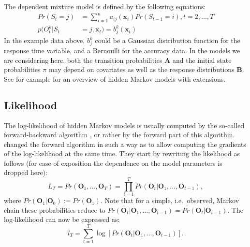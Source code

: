 \documentclass[article]{jss}
\newcommand{\vc}{\mathbf}
\newcommand{\mat}{\mathbf}
\begin{document}
The dependent mixture model is defined by the following equations: 
\begin{align}
	Pr(S_{t} = j) &= \sum_{i=1}^n a_{ij}(\vc{x}_t) Pr(S_{t-1} = i), t=2, \ldots, T \\
	p(O_{t}^k|S_t &= j, \vc{x}_t) = b_j^k(\vc{x}_t)
\end{align}
In the example data above, $b_j^k$ could be a Gaussian distribution
function for the response time variable, and a Bernoulli for the
accuracy data.  In the models we are considering here, both the
transition probabilities $\mat{A}$ and the initial state probabilities $\pi$
may depend on covariates as well as the response distributions $\vc{B}$. 
See for example \citet{Fruhwirth2006} for an overview of 
hidden Markov models with extensions. 

\subsection{Likelihood}

The log-likelihood of hidden Markov models is usually computed by the
so-called forward-backward algorithm \citep{Baum1966,Rabiner1989}, or
rather by the forward part of this algorithm.  \cite{Lystig2002}
changed the forward algorithm in such a way as to allow computing the
gradients of the log-likelihood at the same time.  They start by
rewriting the likelihood as follows (for ease of exposition the
dependence on the model parameters is dropped here):
\begin{equation}
	L_{T} = Pr(\vc{O}_{1}, \ldots, \vc{O}_{T}) = \prod_{t=1}^{T} 
Pr(\vc{O}_{t}|\vc{O}_{1}, 
	\ldots, \vc{O}_{t-1}), 
	\label{condLike}
\end{equation}
where $Pr(\vc{O}_{1}|\vc{O}_{0}):=Pr(\vc{O}_{1})$. Note that for a 
simple, i.e.\ observed, Markov chain these probabilities reduce to 
$Pr(\vc{O}_{t}|\vc{O}_{1},\ldots, 
\vc{O}_{t-1})=Pr(\vc{O}_{t}|\vc{O}_{t-1})$.
The log-likelihood can now be expressed as:
\begin{equation}
	l_{T} = \sum_{t=1}^{T} \log[Pr(\vc{O}_{t}|\vc{O}_{1}, \ldots, 
\vc{O}_{t-1})].
	\label{eq:condLogl}
\end{equation}
\end{document}
